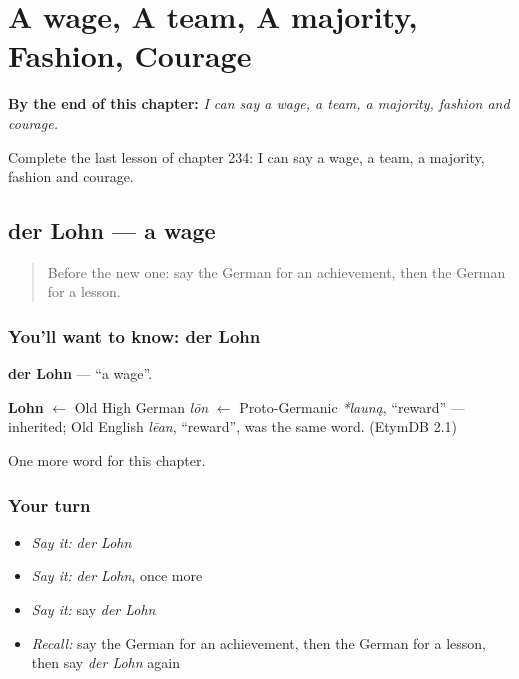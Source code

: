 
\chapter{A wage, A team, A majority, Fashion, Courage}
\label{ch:ge-a-wage-a-team-a-majority-fashion-courage}

\begin{chapteropening}
\textbf{By the end of this chapter:} \emph{I can say a wage, a team, a majority, fashion and courage.}

Complete the last lesson of chapter 234: I can say a wage, a team, a majority, fashion and courage.
\end{chapteropening}

\section[der Lohn]{der Lohn — a wage}

\label{lesson:GE-C234-lohn}



\begin{quote}
Before the new one: say the German for an achievement, then the German for a lesson.
\end{quote}

\subsection*{You'll want to know: der Lohn}
\textbf{der Lohn} — \textquotedblleft{}a wage\textquotedblright{}.

\begin{cousinweb}
\textbf{Lohn} $\leftarrow$ Old High German \emph{lōn} $\leftarrow$ Proto-Germanic \emph{*launą}, \textquotedblleft{}reward\textquotedblright{} — inherited; Old English \emph{lēan}, \textquotedblleft{}reward\textquotedblright{}, was the same word. (EtymDB 2.1)
\end{cousinweb}

\begin{grammarlens}[title={What you've built}]
One more word for this chapter.
\end{grammarlens}

\subsection*{Your turn}
\begin{itemize}
\raggedright
  \item \emph{Say it:} \emph{der Lohn}
  \item \emph{Say it:} \emph{der Lohn}, once more
  \item \emph{Say it:} say \emph{der Lohn}
  \item \emph{Recall:} say the German for an achievement, then the German for a lesson, then say \emph{der Lohn} again
\end{itemize}

